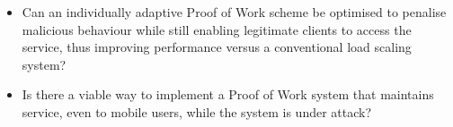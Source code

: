 \begin{itemize}
\item Can an individually adaptive Proof of Work scheme be optimised to penalise malicious behaviour while still enabling legitimate clients to access the service, thus improving performance versus a conventional load scaling system?

\item Is there a viable way to implement a Proof of Work system that maintains service, even to mobile users, while the system is under attack?

\end{itemize}

\begin{comment}
With the problem defined the question at hand is thus if it is possible to develop a Proof of Work protocol that is independent of client characteristics.
\begin{itemize}
\item Is there a viable way to implement a Proof of Work system so that the system's resources are accessable by a diverse variety of devices?

\item How should the protocol be optimised for low impact on legitimate client behaviour and high impact on malicious behaviour?

\item What advantages and disadvantages does proof of work concept bring in practice and in which applications could it be an improvement to current security?
\end{itemize}
\end{comment}